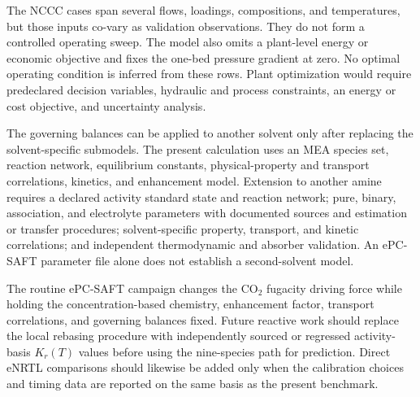         The NCCC cases span several flows, loadings, compositions, and temperatures, but those inputs co-vary as validation observations. They do not form a controlled operating sweep. The model also omits a plant-level energy or economic objective and fixes the one-bed pressure gradient at zero. No optimal operating condition is inferred from these rows. Plant optimization would require predeclared decision variables, hydraulic and process constraints, an energy or cost objective, and uncertainty analysis.

        The governing balances can be applied to another solvent only after replacing the solvent-specific submodels. The present calculation uses an MEA species set, reaction network, equilibrium constants, physical-property and transport correlations, kinetics, and enhancement model. Extension to another amine requires a declared activity standard state and reaction network; pure, binary, association, and electrolyte parameters with documented sources and estimation or transfer procedures; solvent-specific property, transport, and kinetic correlations; and independent thermodynamic and absorber validation. An ePC-SAFT parameter file alone does not establish a second-solvent model.

        The routine ePC-SAFT campaign changes the CO$_2$ fugacity driving force while holding the concentration-based chemistry, enhancement factor, transport correlations, and governing balances fixed. Future reactive work should replace the local rebasing procedure with independently sourced or regressed activity-basis $K_r(T)$ values before using the nine-species path for prediction. Direct eNRTL comparisons should likewise be added only when the calibration choices and timing data are reported on the same basis as the present benchmark.
